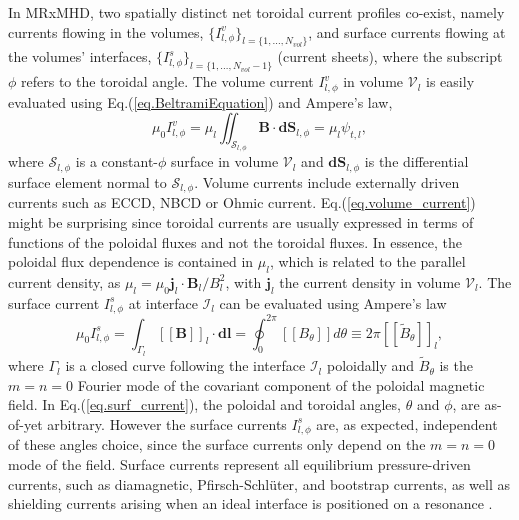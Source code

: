 \documentclass[my_thesis.tex]{subfiles}
\begin{document}
In \ac{MRxMHD}, two spatially distinct net toroidal current profiles co-exist, namely currents flowing in the volumes, $\{I^v_{l,\phi}\}_{l=\{1,\ldots,N_{vol}\}}$, and surface currents flowing at the volumes' interfaces, $\{I^s_{l,\phi}\}_{l=\{1,\ldots,N_{vol}-1\}}$ (current sheets), where the subscript $\phi$ refers to the toroidal angle. The volume current $I^v_{l,\phi}$ in volume $\mathcal{V}_l$ is easily evaluated using Eq.(\ref{eq.BeltramiEquation}) and Ampere's law,
\begin{equation}
    \mu_0I^v_{l,\phi} = \mu_l\iint_{\mathcal{S}_{l,\phi}} \mathbf{B}\cdot\mathbf{dS}_{l,\phi} = \mu_l \psi_{t,l},
    \label{eq.volume_current}
\end{equation}
where $\mathcal{S}_{l,\phi}$ is a constant-$\phi$ surface in volume $\mathcal{V}_l$ and $\mathbf{dS}_{l,\phi}$ is the differential surface element normal to $\mathcal{S}_{l,\phi}$. Volume currents include externally driven currents such as \ac{ECCD}, \ac{NBCD} or Ohmic current. Eq.(\ref{eq.volume_current}) might be surprising since toroidal currents are usually expressed in terms of functions of the poloidal fluxes and not the toroidal fluxes. In essence, the poloidal flux dependence is contained in $\mu_l$, which is related to the parallel current density, as $\mu_l = \mu_0 \mathbf{j}_l\cdot\mathbf{B}_l / B_l^2$, with $\mathbf{j}_l$ the current density in volume $\mathcal{V}_l$. The surface current $I^s_{l,\phi}$ at interface $\mathcal{I}_l$ can be evaluated using Ampere's law
\begin{equation}
    \mu_0I^s_{l,\phi} = \int_{\Gamma _l} \left[\left[ \mathbf{B} \right]\right]_l \cdot \mathbf{dl} = \oint_0^{2\pi} \left[\left[B_\theta\right]\right] d\theta \equiv 2\pi \left[\left[ \tilde{B}_{\theta} \right]\right]_l, \label{eq.surf_current}
\end{equation}
where $\Gamma_l$ is a closed curve following the interface $\mathcal{I}_l$ poloidally and $\tilde{B}_{\theta}$ is the $m=n=0$ Fourier mode of the covariant component of the poloidal magnetic field. In Eq.(\ref{eq.surf_current}), the poloidal and toroidal angles, $\theta$ and $\phi$, are as-of-yet arbitrary. However the surface currents $I^s_{l,\phi}$ are, as expected, independent of these angles choice, since the surface currents only depend on the $m=n=0$ mode of the field. Surface currents represent all equilibrium pressure-driven currents, such as diamagnetic, Pfirsch-Schl\"uter, and bootstrap currents, as well as shielding currents arising when an ideal interface is positioned on a resonance \citep{Loizu2015}.
\end{document}
